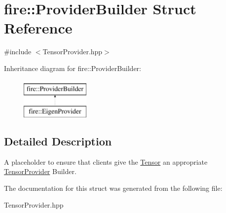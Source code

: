 \hypertarget{a00846}{}\section{fire\+:\+:Provider\+Builder Struct Reference}
\label{a00846}


{\ttfamily \#include $<$Tensor\+Provider.\+hpp$>$}

Inheritance diagram for fire\+:\+:Provider\+Builder\+:\begin{figure}[H]
\begin{center}
\leavevmode
\includegraphics[height=2.000000cm]{a00846}
\end{center}
\end{figure}


\subsection{Detailed Description}
A placeholder to ensure that clients give the \hyperlink{a00838}{Tensor} an appropriate \hyperlink{a00842}{Tensor\+Provider} Builder. 

The documentation for this struct was generated from the following file\+:\begin{DoxyCompactItemize}
\item 
Tensor\+Provider.\+hpp\end{DoxyCompactItemize}
